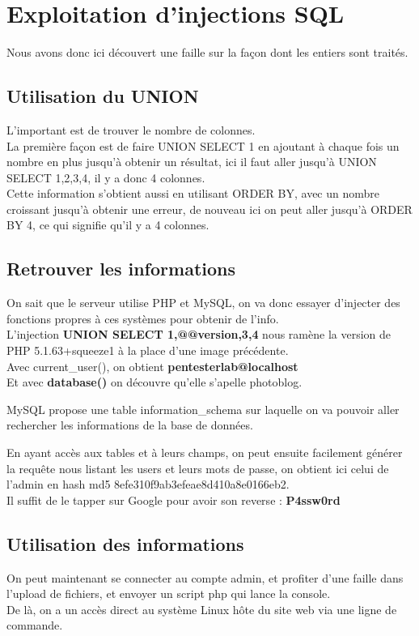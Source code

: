 \documentclass[a4paper,10pt,final,fleqn]{article}
\begin{document}
	\section{Exploitation d'injections SQL}

		Nous avons donc ici découvert une faille sur la façon dont les entiers sont traités.

		\subsection{Utilisation du UNION}

			L'important est de trouver le nombre de colonnes.\\

			La première façon est de faire UNION SELECT 1 en ajoutant à chaque fois un nombre en plus jusqu'à obtenir un résultat, ici il faut aller jusqu'à UNION SELECT 1,2,3,4, il y a donc 4 colonnes.\\

			Cette information s'obtient aussi en utilisant ORDER BY, avec un nombre croissant jusqu'à obtenir une erreur, de nouveau ici on peut aller jusqu'à ORDER BY 4, ce qui signifie qu'il y a 4 colonnes.\\

		\subsection{Retrouver les informations}

			On sait que le serveur utilise PHP et MySQL, on va donc essayer d'injecter des fonctions propres à ces systèmes pour obtenir de l'info.\\

			L'injection \textbf{UNION SELECT 1,@@version,3,4} nous ramène la version de PHP 5.1.63+squeeze1 à la place d'une image précédente.\\

			Avec current_user(), on obtient \textbf{pentesterlab@localhost}\\

			Et avec \textbf{database()} on découvre qu'elle s'apelle photoblog.

			MySQL propose une table information_schema sur laquelle on va pouvoir aller rechercher les informations de la base de données.

			En ayant accès aux tables et à leurs champs, on peut ensuite facilement générer la requête nous listant les users et leurs mots de passe, on obtient ici celui de l'admin en hash md5 8efe310f9ab3efeae8d410a8e0166eb2.\\
			Il suffit de le tapper sur Google pour avoir son reverse : \textbf{P4ssw0rd}\\

		\subsection{Utilisation des informations}

			On peut maintenant se connecter au compte admin, et profiter d'une faille dans l'upload de fichiers, et envoyer un script php qui lance la console.\\
			De là, on a un accès direct au système Linux hôte du site web via une ligne de commande.\\
\end{document}
